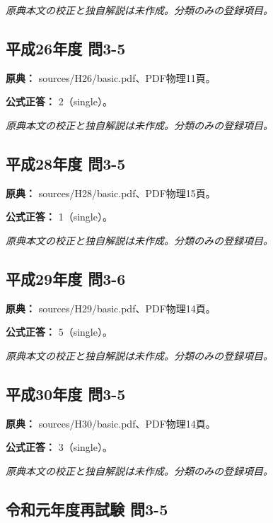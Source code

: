 \par\textit{原典本文の校正と独自解説は未作成。分類のみの登録項目。}

\subsection{平成26年度 問3-5}
\label{q:h26-reg-basic-3-5}

\noindent\textbf{原典：} sources/H26/basic.pdf、PDF物理11頁。

\textbf{公式正答：} 2（single）。

\par\textit{原典本文の校正と独自解説は未作成。分類のみの登録項目。}

\subsection{平成28年度 問3-5}
\label{q:h28-reg-basic-3-5}

\noindent\textbf{原典：} sources/H28/basic.pdf、PDF物理15頁。

\textbf{公式正答：} 1（single）。

\par\textit{原典本文の校正と独自解説は未作成。分類のみの登録項目。}

\subsection{平成29年度 問3-6}
\label{q:h29-reg-basic-3-6}

\noindent\textbf{原典：} sources/H29/basic.pdf、PDF物理14頁。

\textbf{公式正答：} 5（single）。

\par\textit{原典本文の校正と独自解説は未作成。分類のみの登録項目。}

\subsection{平成30年度 問3-5}
\label{q:h30-reg-basic-3-5}

\noindent\textbf{原典：} sources/H30/basic.pdf、PDF物理14頁。

\textbf{公式正答：} 3（single）。

\par\textit{原典本文の校正と独自解説は未作成。分類のみの登録項目。}

\subsection{令和元年度再試験 問3-5}
\label{q:r01-ret-basic-3-5}

